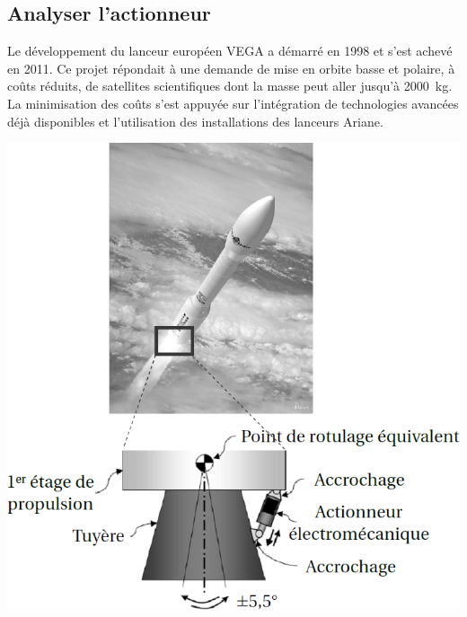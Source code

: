\documentclass[10pt,fleqn]{article} %
\begin{document}
\def\pathfig{images}

\vspace{8cm}
\pagestyle{fancy}
\thispagestyle{plain}

\def\columnseprulecolor{\color{ocre}}
\setlength{\columnseprule}{0.4pt} 

\def\pathfig{images}

\begin{multicols}{2}



\section*{Analyser l'actionneur \\}





Le développement du lanceur européen VEGA a démarré en 1998 et s'est achevé en 2011. Ce projet répondait à une demande de mise en orbite basse et polaire, à coûts réduits, de satellites scientifiques dont la masse peut aller jusqu'à \SI{2 000}{kg}. La minimisation des coûts s'est appuyée sur l'intégration de technologies avancées déjà disponibles et l'utilisation des installations des lanceurs Ariane.


\begin{center}
\includegraphics[width=.95\linewidth]{images/fig_01}
\end{center}


\end{multicols}
\end{document}
